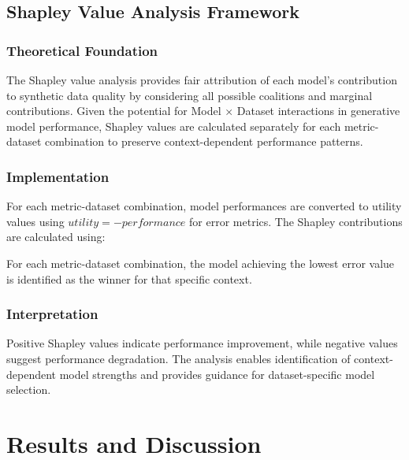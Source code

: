 \documentclass{article}
\begin{document}
\subsection{Shapley Value Analysis Framework}

\subsubsection{Theoretical Foundation}
The Shapley value analysis provides fair attribution of each model's contribution to synthetic data quality by considering all possible coalitions and marginal contributions. Given the potential for Model × Dataset interactions in generative model performance, Shapley values are calculated separately for each metric-dataset combination to preserve context-dependent performance patterns.

\subsubsection{Implementation}
For each metric-dataset combination, model performances are converted to utility values using $utility = -performance$ for error metrics. The Shapley contributions are calculated using:




For each metric-dataset combination, the model achieving the lowest error value is identified as the winner for that specific context.

\subsubsection{Interpretation}
Positive Shapley values indicate performance improvement, while negative values suggest performance degradation. The analysis enables identification of context-dependent model strengths and provides guidance for dataset-specific model selection.


\newpage

\section{Results and Discussion}
\end{document}
